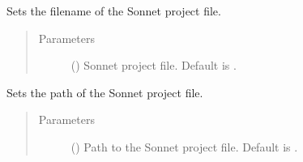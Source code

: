 \documentclass[letterpaper,10pt,english,openany]{sphinxmanual}
\begin{document}
\begin{fulllineitems}
\begin{fulllineitems}
\begin{quote}
\begin{description}
\end{description}\end{quote}

\end{fulllineitems}


\begin{fulllineitems}
\label{\detokenize{source/sonpy:sonpy.sonnet.setSonnetFile}}
Sets the filename of the Sonnet project file.
\begin{quote}\begin{description}
\item[{Parameters}] \leavevmode
{} () \textendash{} Sonnet project file. Default is .

\end{description}\end{quote}

\end{fulllineitems}


\begin{fulllineitems}
\label{\detokenize{source/sonpy:sonpy.sonnet.setSonnetFilePath}}
Sets the path of the Sonnet project file.
\begin{quote}\begin{description}
\item[{Parameters}] \leavevmode
{} () \textendash{} Path to the Sonnet project file. Default is .

\end{description}\end{quote}

\end{fulllineitems}



\end{fulllineitems}
\end{document}
